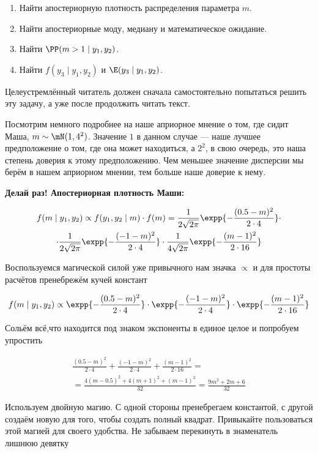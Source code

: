 \begin{enumerate}
\item Найти апостериорную плотность распределения параметра $m$.
\item Найти апостериорные моду, медиану и математическое ожидание.
\item Найти $\PP(m > 1 \mid y_1,y_2)$.
\item Найти $f(y_3 \mid y_1,y_2)$ и $\E(y_3 \mid y_1,y_2)$.
\end{enumerate}

Целеустремлённый читатель должен сначала самостоятельно попытаться решить эту задачу, а уже после продолжить читать текст.

Посмотрим немного подробнее на наше априорное мнение о том, где сидит Маша, $m \sim \mN(1, 4^2)$. Значение $1$ в данном случае --- наше лучшее предположение о том, где она может находиться, а $2^2$, в свою очередь, это наша степень доверия к этому предположению. Чем меньшее значение дисперсии мы берём в нашем априорном мнении, тем больше наше доверие к нему.

\textbf{Делай раз! Апостериорная плотность Маши:}

\begin{multline*}
f(m \mid y_1, y_2) \propto f(y_1,y_2 \mid m) \cdot f(m) = \frac{1}{2\sqrt{2\pi}}\expp{-\frac{(0.5 - m)^2}{2 \cdot 4}} \cdot \\ \cdot \frac{1}{2\sqrt{2\pi}}\expp{-\frac{(-1 - m)^2}{2 \cdot 4}} \cdot \frac{1}{4\sqrt{2\pi}}\expp{-\frac{(m-1)^2}{2 \cdot 16}}
\end{multline*} 

Воспользуемся магической силой уже привычного нам значка $\propto$ и для простоты расчётов пренебрежём кучей констант

\[ f(m \mid y_1, y_2) \propto \expp{-\frac{(0.5 - m)^2}{2 \cdot 4}} \cdot \expp{-\frac{(-1 - m)^2}{2 \cdot 4}} \cdot \expp{-\frac{(m-1)^2}{2 \cdot 16}}\]

Сольём всё,что находится под знаком экспоненты в единое целое и попробуем упростить

\begin{multline*}
 \frac{(0.5 - m)^2}{2 \cdot 4} + \frac{(-1 - m)^2}{2 \cdot 4} + \frac{(m-1)^2}{2 \cdot 16}  = \\ = \frac{ 4(m - 0.5)^2 + 4(m+1)^2 + (m-1)^2}{32} = \frac{9m^2 + 2m + 6}{32} 
\end{multline*}

Используем двойную магию. С одной стороны пренебрегаем константой, с другой создаём новую для того, чтобы создать полный квадрат. Привыкайте пользоваться этой магией для своего удобства. Не забываем перекинуть в знаменатель лишнюю девятку

